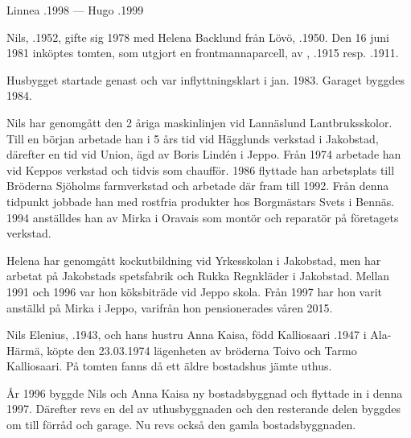 Linnea .1998  ---  Hugo .1999





Nils, .1952, gifte sig 1978 med Helena Backlund från Lövö, .1950. Den 16 juni 1981 inköptes tomten, som utgjort en frontmannaparcell, av , .1915 resp. .1911.

Husbygget startade genast och var inflyttningsklart i  jan. 1983. Garaget byggdes 1984.

Nils har genomgått den 2 åriga maskinlinjen vid Lannäslund Lantbruksskolor. Till en början arbetade han i 5 års tid vid Hägglunds verkstad i Jakobstad, därefter en tid vid Union, ägd av Boris Lindén i Jeppo. Från 1974 arbetade han vid Keppos verkstad och tidvis som chaufför. 1986 flyttade han arbetsplats till Bröderna Sjöholms farmverkstad och arbetade där fram till 1992. Från denna tidpunkt jobbade han med rostfria produkter hos Borgmästars Svets i Bennäs. 1994 anställdes han av Mirka i Oravais som montör och reparatör på företagets verkstad.

Helena har genomgått kockutbildning vid Yrkesskolan i Jakobstad, men har arbetat på Jakobstads spetsfabrik och Rukka Regnkläder i Jakobstad. Mellan 1991 och 1996 var hon köksbiträde vid Jeppo skola. Från 1997 har hon varit anställd på Mirka i Jeppo, varifrån hon pensionerades våren 2015.
\begin{jhchildren}
  \item {}
  \item {}
\end{jhchildren}






Nils Elenius, .1943, och hans hustru Anna Kaisa, född Kalliosaari .1947 i Ala-Härmä, köpte den 23.03.1974 lägenheten av bröderna Toivo och Tarmo Kalliosaari. På tomten fanns då ett äldre bostadshus jämte uthus.

År 1996 byggde Nils och Anna Kaisa ny bostadsbyggnad och flyttade in i denna 1997. Därefter revs en del av uthusbyggnaden och den resterande delen byggdes om till förråd och garage. Nu revs också den gamla bostadsbyggnaden.

